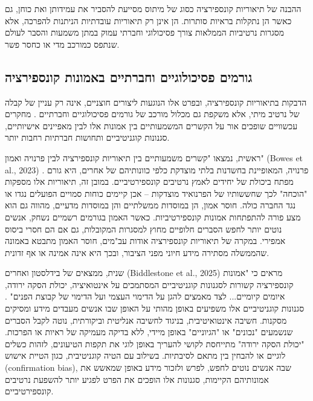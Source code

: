 \documentclass[12pt,a4paper]{article}
\begin{document}
ההבנה של תיאוריות קונספירציה כסוג של מיתוס מסייעת להסביר את עמידותן ואת כוחן, גם כאשר הן נתקלות בראיות סותרות. הן אינן רק תיאוריות עובדתיות הניתנות להפרכה, אלא מסגרות נרטיביות הממלאות צורך פסיכולוגי וחברתי עמוק במתן משמעות והסבר לעולם שנתפס כמורכב מדי או כחסר פשר.

\subsection{גורמים פסיכולוגיים וחברתיים באמונות קונספירציה}

הדבקות בתיאוריות קונספירציה, ובפרט אלו הנוגעות ליצורים חוצניים, אינה רק עניין של קבלה של נרטיב מיתי, אלא משקפת גם מכלול מורכב של גורמים פסיכולוגיים וחברתיים \cite{bowes2023conspiracy, biddlestone2025conspiracy, ellwood1999ufo}. מחקרים עכשוויים שופכים אור על הקשרים המשמעותיים בין אמונות אלו לבין מאפיינים אישיותיים, סגנונות קוגניטיביים ותחושות חברתיות רחבות יותר.

ראשית, נמצאו "קשרים משמעותיים בין תיאוריות קונספירציה לבין פרנויה ואמון" (Bowes et al., 2023) \cite{bowes2023conspiracy}. פרנויה, המאופיינת בחשדנות בלתי מוצדקת כלפי כוונותיהם של אחרים, היא גורם מפתח ביכולת של יחידים לאמץ נרטיבים קונספירטיביים. במובן זה, תיאוריות אלו מספקות "הוכחה" לכך שחששותיו של הפרנואיד מוצדקות – אכן קיימים כוחות סמויים הפועלים נגדו או נגד החברה כולה. חוסר אמון, הן במוסדות ממשלתיים והן במוסדות מדעיים, מהווה גם הוא מצע פורה להתפתחות אמונות קונספירטיביות. כאשר האמון בגורמים רשמיים נשחק, אנשים נוטים יותר לחפש הסברים חלופיים מחוץ למסגרות המקובלות, גם אם הם חסרי ביסוס אמפירי. במקרה של תיאוריות קונספירציה אודות עב"מים, חוסר האמון מתבטא באמונה שהממשלה מסתירה מידע חיוני מפני הציבור, ובכך היא אינה אמינה או אף זדונית.

שנית, ממצאים של בידלסטון ואחרים (Biddlestone et al., 2025) מראים כי "אמונות קונספירציה קשורות לסגנונות קוגניטיביים המסתמכים על אינטואיציה, יכולת הסקה ירודה, איומים קיומיים... לצד מאמצים להגן על הדימוי העצמי ועל הדימוי של קבוצת הפנים" \cite{biddlestone2025conspiracy}. סגנונות קוגניטיביים אלו משפיעים באופן מהותי על האופן שבו אנשים מעבדים מידע ומסיקים מסקנות. חשיבה אינטואיטיבית, בניגוד לחשיבה אנליטית וביקורתית, נוטה לקבל הסברים שנשמעים "נכונים" או "הגיוניים" באופן מיידי, ללא בדיקה מעמיקה של ראיות או הפרכות. "יכולת הסקה ירודה" מתייחסת לקושי להעריך באופן לוגי את תקפות הטיעונים, לזהות כשלים לוגיים או להבחין בין מתאם לסיבתיות. בשילוב עם הטיה קוגניטיבית, כגון הטיית אישוש (confirmation bias), שבה אנשים נוטים לחפש, לפרש ולזכור מידע באופן שמאשש את אמונותיהם הקיימות, סגנונות אלו הופכים את הפרט לפגיע יותר להשפעת נרטיבים קונספירטיביים.
\end{document}
